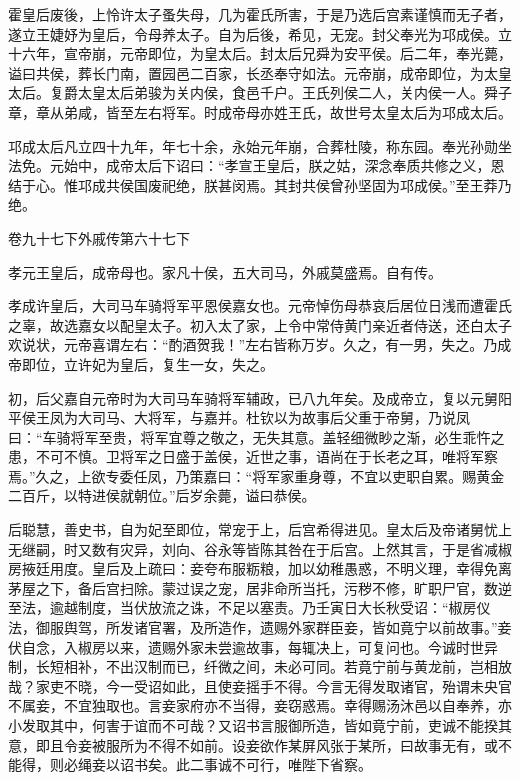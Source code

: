 \documentclass[12pt,UTF8]{ctexbook}
\begin{document}
霍皇后废後，上怜许太子蚤失母，几为霍氏所害，于是乃选后宫素谨慎而无子者，遂立王婕妤为皇后，令母养太子。自为后後，希见，无宠。封父奉光为邛成侯。立十六年，宣帝崩，元帝即位，为皇太后。封太后兄舜为安平侯。后二年，奉光薨，谥曰共侯，葬长门南，置园邑二百家，长丞奉守如法。元帝崩，成帝即位，为太皇太后。复爵太皇太后弟骏为关内侯，食邑千户。王氏列侯二人，关内侯一人。舜子章，章从弟咸，皆至左右将军。时成帝母亦姓王氏，故世号太皇太后为邛成太后。



邛成太后凡立四十九年，年七十余，永始元年崩，合葬杜陵，称东园。奉光孙勋坐法免。元始中，成帝太后下诏曰：“孝宣王皇后，朕之姑，深念奉质共修之义，恩结于心。惟邛成共侯国废祀绝，朕甚闵焉。其封共侯曾孙坚固为邛成侯。”至王莽乃绝。





卷九十七下外戚传第六十七下



孝元王皇后，成帝母也。家凡十侯，五大司马，外戚莫盛焉。自有传。



孝成许皇后，大司马车骑将军平恩侯嘉女也。元帝悼伤母恭哀后居位日浅而遭霍氏之辜，故选嘉女以配皇太子。初入太了家，上令中常侍黄门亲近者侍送，还白太子欢说状，元帝喜谓左右：“酌酒贺我！”左右皆称万岁。久之，有一男，失之。乃成帝即位，立许妃为皇后，复生一女，失之。



初，后父嘉自元帝时为大司马车骑将军辅政，已八九年矣。及成帝立，复以元舅阳平侯王凤为大司马、大将军，与嘉并。杜钦以为故事后父重于帝舅，乃说凤曰：“车骑将军至贵，将军宜尊之敬之，无失其意。盖轻细微眇之渐，必生乖忤之患，不可不慎。卫将军之日盛于盖侯，近世之事，语尚在于长老之耳，唯将军察焉。”久之，上欲专委任凤，乃策嘉曰：“将军家重身尊，不宜以吏职自累。赐黄金二百斤，以特进侯就朝位。”后岁余薨，谥曰恭侯。



后聪慧，善史书，自为妃至即位，常宠于上，后宫希得进见。皇太后及帝诸舅忧上无继嗣，时又数有灾异，刘向、谷永等皆陈其咎在于后宫。上然其言，于是省减椒房掖廷用度。皇后及上疏曰：妾夸布服粝粮，加以幼稚愚惑，不明义理，幸得免离茅屋之下，备后宫扫除。蒙过误之宠，居非命所当托，污秽不修，旷职尸官，数逆至法，逾越制度，当伏放流之诛，不足以塞责。乃壬寅日大长秋受诏：“椒房仪法，御服舆驾，所发诸官署，及所造作，遗赐外家群臣妾，皆如竟宁以前故事。”妾伏自念，入椒房以来，遗赐外家未尝逾故事，每辄决上，可复问也。今诚时世异制，长短相补，不出汉制而已，纤微之间，未必可同。若竟宁前与黄龙前，岂相放哉？家吏不晓，今一受诏如此，且使妾摇手不得。今言无得发取诸官，殆谓未央官不属妾，不宜独取也。言妾家府亦不当得，妾窃惑焉。幸得赐汤沐邑以自奉养，亦小发取其中，何害于谊而不可哉？又诏书言服御所造，皆如竟宁前，吏诚不能揆其意，即且令妾被服所为不得不如前。设妾欲作某屏风张于某所，曰故事无有，或不能得，则必绳妾以诏书矣。此二事诚不可行，唯陛下省察。
\end{document}
